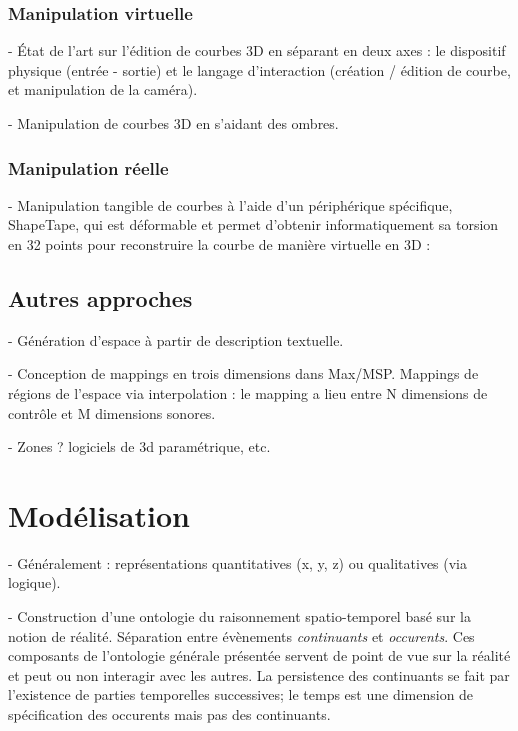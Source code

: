 \documentclass[french,12pt]{article}
\begin{document}
\subsubsection{Manipulation virtuelle}
- État de l'art sur l'édition de courbes 3D en séparant en deux axes : le dispositif physique (entrée - sortie) et le langage d'interaction (création / édition de courbe, et manipulation de la caméra).
\cite{jacob_design_2014} %

- Manipulation de courbes 3D en s'aidant des ombres.
\cite{cohen_interface_1999}

\subsubsection{Manipulation réelle}
- Manipulation tangible de courbes à l'aide d'un périphérique spécifique, ShapeTape, qui est déformable et permet d'obtenir informatiquement sa torsion en 32 points pour reconstruire la courbe de manière virtuelle en 3D : 
\cite{grossman_interface_2003}

\subsection{Autres approches}
- Génération d'espace à partir de description textuelle.
\cite{andriamarozakaniaina_du_2012} 

- Conception de mappings en trois dimensions dans Max/MSP. Mappings de régions de l'espace via interpolation : le mapping a lieu entre N dimensions de contrôle et M dimensions sonores.
\cite{van_nort_lom_2006}


 - Zones ? logiciels de 3d paramétrique, etc. %

\section{Modélisation}
- Généralement : représentations quantitatives (x, y, z) ou qualitatives (via logique).
\cite{porter_handbook_2008}

- Construction d'une ontologie du raisonnement spatio-temporel basé sur la notion de réalité. Séparation entre évènements \textit{continuants} et \textit{occurents}. Ces composants de l'ontologie générale présentée servent de point de vue sur la réalité et peut ou non interagir avec les autres. La persistence des continuants se fait par l'existence de parties temporelles successives; le temps est une dimension de spécification des occurents mais pas des continuants.
\cite{grenon_formal_2003}
\end{document}
